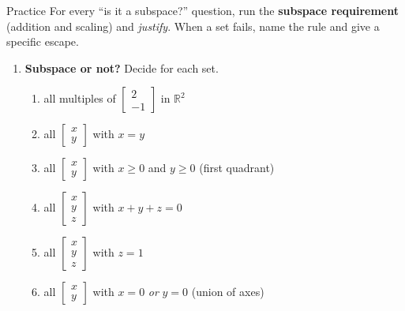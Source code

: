 \documentclass[10pt]{article}
\begin{document}
\namedateperiod

\vspace{0.12in}

\begin{notesbox}{Practice}
For every ``is it a subspace?'' question, run the \textbf{subspace requirement} (addition and
scaling) and \emph{justify}. When a set fails, name the rule and give a specific escape.

\begin{enumerate}[leftmargin=1.9em, itemsep=11pt]
  \item \textbf{Subspace or not?} Decide for each set.
    \begin{enumerate}[label=(\alph*), leftmargin=1.8em, itemsep=6pt]
      \item all multiples of $\begin{bmatrix} 2 \\ -1 \end{bmatrix}$ in $\mathbb{R}^2$ \vspace{0.7cm}
      \item all $\begin{bmatrix} x \\ y \end{bmatrix}$ with $x=y$ \vspace{0.7cm}
      \item all $\begin{bmatrix} x \\ y \end{bmatrix}$ with $x\ge 0$ and $y\ge 0$ (first quadrant) \vspace{0.7cm}
      \item all $\begin{bmatrix} x \\ y \\ z \end{bmatrix}$ with $x+y+z=0$ \vspace{0.7cm}
      \item all $\begin{bmatrix} x \\ y \\ z \end{bmatrix}$ with $z=1$ \vspace{0.7cm}
      \item all $\begin{bmatrix} x \\ y \end{bmatrix}$ with $x=0$ \emph{or} $y=0$ (union of axes) \vspace{0.7cm}

\end{enumerate}
\end{enumerate}
\end{notesbox}
\end{document}
